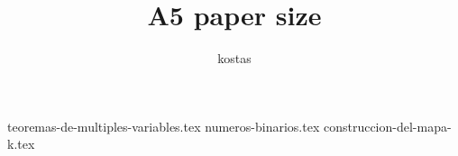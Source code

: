 \documentclass[10pt,a5paper]{article}
\title{A5 paper size}
\author{kostas}
\begin{document}
{teoremas-de-multiples-variables.tex}
{numeros-binarios.tex}
{construccion-del-mapa-k.tex}

\end{document}
